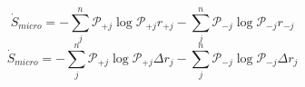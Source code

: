 \begin{equation}
\dot S_{micro} = -\sum_j^n\mathcal P_{+j}\log\mathcal P_{+j}r_{+j} -\sum_j^n\mathcal P_{-j}\log\mathcal P_{-j} r_{-j}
\end{equation}
\begin{equation}
\dot S_{micro} = -\sum_j^n\mathcal P_{+j}\log\mathcal P_{+j}\Delta r_j -\sum_j^n\mathcal P_{-j}\log\mathcal P_{-j} \Delta r_j
\end{equation}
